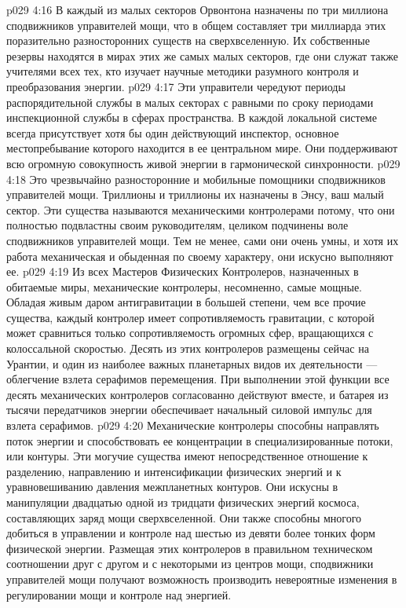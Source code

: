 \vs p029 4:16 В каждый из малых секторов Орвонтона назначены по три миллиона сподвижников управителей мощи, что в общем составляет три миллиарда этих поразительно разносторонних существ на сверхвселенную. Их собственные резервы находятся в мирах этих же самых малых секторов, где они служат также учителями всех тех, кто изучает научные методики разумного контроля и преобразования энергии.
\vs p029 4:17 Эти управители чередуют периоды распорядительной службы в малых секторах с равными по сроку периодами инспекционной службы в сферах пространства. В каждой локальной системе всегда присутствует хотя бы один действующий инспектор, основное местопребывание которого находится в ее центральном мире. Они поддерживают всю огромную совокупность живой энергии в гармонической синхронности.
\vs p029 4:18 \pc {}\bibnobreakspace {} Это чрезвычайно разносторонние и мобильные помощники сподвижников управителей мощи. Триллионы и триллионы их назначены в Энсу, ваш малый сектор. Эти существа называются механическими контролерами потому, что они полностью подвластны своим руководителям, целиком подчинены воле сподвижников управителей мощи. Тем не менее, сами они очень умны, и хотя их работа механическая и обыденная по своему характеру, они искусно выполняют ее.
\vs p029 4:19 Из всех Мастеров Физических Контролеров, назначенных в обитаемые миры, механические контролеры, несомненно, самые мощные. Обладая живым даром антигравитации в большей степени, чем все прочие существа, каждый контролер имеет сопротивляемость гравитации, с которой может сравниться только сопротивляемость огромных сфер, вращающихся с колоссальной скоростью. Десять из этих контролеров размещены сейчас на Урантии, и один из наиболее важных планетарных видов их деятельности --- облегчение взлета серафимов перемещения. При выполнении этой функции все десять механических контролеров согласованно действуют вместе, и батарея из тысячи передатчиков энергии обеспечивает начальный силовой импульс для взлета серафимов.
\vs p029 4:20 Механические контролеры способны направлять поток энергии и способствовать ее концентрации в специализированные потоки, или контуры. Эти могучие существа имеют непосредственное отношение к разделению, направлению и интенсификации физических энергий и к уравновешиванию давления межпланетных контуров. Они искусны в манипуляции двадцатью одной из тридцати физических энергий космоса, составляющих заряд мощи сверхвселенной. Они также способны многого добиться в управлении и контроле над шестью из девяти более тонких форм физической энергии. Размещая этих контролеров в правильном техническом соотношении друг с другом и с некоторыми из центров мощи, сподвижники управителей мощи получают возможность производить невероятные изменения в регулировании мощи и контроле над энергией.
